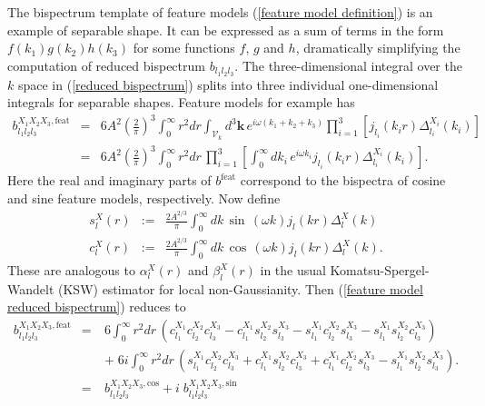 The bispectrum template of feature models (\ref{feature model definition}) is an example of separable shape. It can be expressed as a sum of terms in the form $f(k_1)g(k_2)h(k_3)$ for some functions $f$, $g$ and $h$, dramatically simplifying the computation of reduced bispectrum $b_{l_1 l_2 l_3}$. The three-dimensional integral over the $k$ space in (\ref{reduced bispectrum}) splits into three individual one-dimensional integrals for separable shapes. Feature models for example has
\begin{eqnarray}
	b_{l_1 l_2 l_3}^{X_1 X_2 X_3,\text{feat}} &=& 6A^2 \left( \frac{2}{\pi} \right)^3 \int_0^\infty r^2 dr \int_{\mathcal{V}_k} d^3\mathbf{k}\, e^{i\omega (k_1 + k_2 + k_3)} \prod_{i=1}^{3} \left[ j_{l_i} (k_i r) \Delta_{l_i}^{X_i} (k_i) \right] \nonumber \\
	&=&  6A^2 \left( \frac{2}{\pi} \right)^3 \int_0^\infty r^2 dr \, \prod_{i=1}^{3} \left[ \int_0^\infty dk_i \, e^{i \omega k_i} j_{l_i} (k_i r) \Delta_{l_i}^{X_i} (k_i) \right]. \label{feature model reduced bispectrum}
\end{eqnarray}
Here the real and imaginary parts of $b^\text{feat}$ correspond to the bispectra of cosine and sine feature models, respectively. Now define
\begin{eqnarray}
	s_l^X(r) &:=& \frac{2A^{2/3}}{\pi} \int_0^\infty dk \, \sin\,(\omega k) j_l(kr) \Delta_l^X(k) \\
	c_l^X(r) &:=& \frac{2A^{2/3}}{\pi} \int_0^\infty dk \, \cos\,(\omega k) j_l(kr) \Delta_l^X(k).
\end{eqnarray}
These are analogous to $\alpha_l^X(r)$ and $\beta_l^X(r)$ in the usual Komatsu-Spergel-Wandelt (KSW) estimator for local non-Gaussianity. Then (\ref{feature model reduced bispectrum}) reduces to
\begin{eqnarray}
	b_{l_1 l_2 l_3}^{X_1 X_2 X_3, \text{feat}} &=& 6 \int_0^\infty r^2 dr \, \left(c_{l_1}^{X_1} c_{l_2}^{X_2} c_{l_3}^{X_3} -  c_{l_1}^{X_1} s_{l_2}^{X_2} s_{l_3}^{X_3} -  s_{l_1}^{X_1} c_{l_2}^{X_2} s_{l_3}^{X_3} -  s_{l_1}^{X_1} s_{l_2}^{X_2} c_{l_3}^{X_3} \right)  \nonumber \\
	&\quad& +\; 6i  \int_0^\infty r^2 dr \, \left(s_{l_1}^{X_1}c_{l_2}^{X_2}c_{l_3}^{X_3} + c_{l_1}^{X_1}s_{l_2}^{X_2}c_{l_3}^{X_3} +  c_{l_1}^{X_1}c_{l_2}^{X_2}s_{l_3}^{X_3} -  s_{l_1}^{X_1}s_{l_2}^{X_2}s_{l_3}^{X_3} \right). 	\nonumber \\
	&=& b_{l_1 l_2 l_3}^{X_1 X_2 X_3, \text{cos}} + i \; b_{l_1 l_2 l_3}^{X_1 X_2 X_3, \text{sin}}
	\label{feature model reduced bispectrum sin and cos}
\end{eqnarray}


